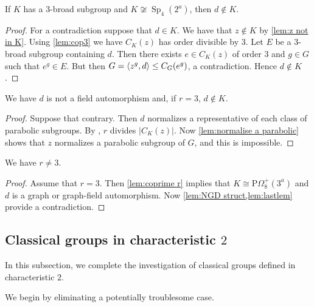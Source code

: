 \documentclass[12pt,a4paper]{amsart}
\DeclareMathOperator{\Sp}{Sp}
\DeclarePairedDelimiter{\gen}{\langle}{\rangle}
\begin{document}
\begin{lemma}\label{lem no 3-broad}
If $K$ has a $3$-broad subgroup and $K \not \cong \Sp_4(2^a)$, then $d\not \in K$.
\end{lemma}

\begin{proof} For a contradiction suppose that $d \in K$. We have that $z \not \in K$ by \cref{lem:z not in K}. Using \cref{lem:cop3} we have $C_K(z)$ has order divisible by $3$. Let $E$ be a $3$-broad subgroup containing $d$. Then there exists $e \in C_K(z)$ of order $3$ and $g\in G$  such that $e^g \in E$. But then $G=\gen{z^g,d} \le C_G(e^g)$, a contradiction. Hence $d \not \in K$.
\end{proof}




\begin{lemma}\label{lem:coprime r}
We have  $d$ is not a field automorphism and, if   $r=3$, $d\not \in K$.
\end{lemma}

\begin{proof} Suppose that contrary. Then
$d$ normalizes a representative of each class of parabolic subgroups. By \cite[Theorem 4.5.1 and Proposition 4.9.1]{GLS3}, $r$ divides  $|C_K(z)|$. Now \cref{lem:normalise a parabolic} shows that $z$ normalizes a parabolic subgroup of $G$, and this is impossible.
\end{proof}

\begin{proposition}\label{prop:not char 3}
 We have $r \ne 3$.
\end{proposition}


\begin{proof} Assume that $r=3$.   Then \cref{lem:coprime r} implies that $K \cong \mathrm P\Omega_8^+(3^a)$ and $d$ is  a graph or graph-field automorphism. Now \cref{lem:NGD struct,lem:lastlem} provide  a contradiction.
\end{proof}








\subsection{Classical groups in characteristic $2$}

In this subsection, we complete the investigation of classical groups defined in characteristic $2$.

We begin by eliminating a potentially troublesome case.
\end{document}
